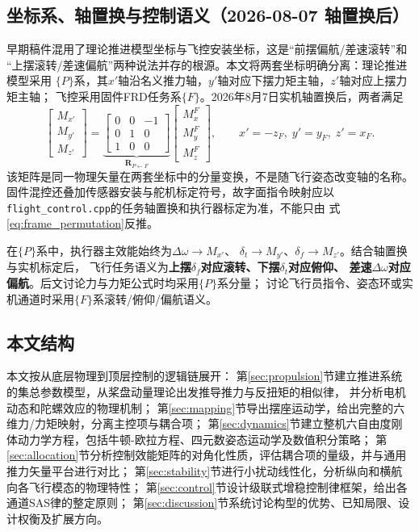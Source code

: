 

\subsection{坐标系、轴置换与控制语义（2026-08-07 轴置换后）}
\label{sec:axis_semantics}

早期稿件混用了理论推进模型坐标与飞控安装坐标，这是“前摆偏航/差速滚转”和
“上摆滚转/差速偏航”两种说法并存的根源。本文将两套坐标明确分离：理论推进模型采用
$\{P\}$系，其$x'$轴沿名义推力轴，$y'$轴对应下摆力矩主轴，$z'$轴对应上摆力矩主轴；
飞控采用固件FRD任务系$\{F\}$。2026年8月7日实机轴置换后，两者满足
\begin{equation}
    \begin{bmatrix} M_{x'} \\ M_{y'} \\ M_{z'} \end{bmatrix}
    =
    \underbrace{\begin{bmatrix}
        0 & 0 & -1 \\
        0 & 1 & 0 \\
        1 & 0 & 0
    \end{bmatrix}}_{\mathbf{R}_{P\leftarrow F}}
    \begin{bmatrix} M_x^F \\ M_y^F \\ M_z^F \end{bmatrix},
    \qquad x'=-z_F,\;y'=y_F,\;z'=x_F .
    \label{eq:frame_permutation}
\end{equation}
该矩阵是同一物理矢量在两套坐标中的分量变换，不是随飞行姿态改变轴的名称。
固件混控还叠加传感器安装与舵机标定符号，故字面指令映射应以
\texttt{flight\_control.cpp}的任务轴置换和执行器标定为准，不能只由
式\eqref{eq:frame_permutation}反推。

在$\{P\}$系中，执行器主效能始终为$\Delta\omega\rightarrow M_{x'}$、
$\delta_t\rightarrow M_{y'}$、$\delta_f\rightarrow M_{z'}$。结合轴置换与实机标定后，
飞行任务语义为\textbf{上摆$\delta_f$对应滚转、下摆$\delta_t$对应俯仰、
差速$\Delta\omega$对应偏航}。后文讨论力与力矩公式时均采用$\{P\}$系分量；
讨论飞行员指令、姿态环或实机通道时采用$\{F\}$系滚转/俯仰/偏航语义。

\subsection{本文结构}

本文按从底层物理到顶层控制的逻辑链展开：
第\ref{sec:propulsion}节建立推进系统的集总参数模型，从桨盘动量理论出发推导推力与反扭矩的相似律，
并分析电机动态和陀螺效应的物理机制；
第\ref{sec:mapping}节导出摆座运动学，给出完整的六维力/力矩映射，分离主控项与耦合项；
第\ref{sec:dynamics}节建立整机六自由度刚体动力学方程，包括牛顿-欧拉方程、四元数姿态运动学及数值积分策略；
第\ref{sec:allocation}节分析控制效能矩阵的对角化性质，评估耦合项的量级，并与通用推力矢量平台进行对比；
第\ref{sec:stability}节进行小扰动线性化，分析纵向和横航向各飞行模态的物理特性；
第\ref{sec:control}节设计级联式增稳控制律框架，给出各通道SAS律的整定原则；
第\ref{sec:discussion}节系统讨论构型的优势、已知局限、设计权衡及扩展方向。

